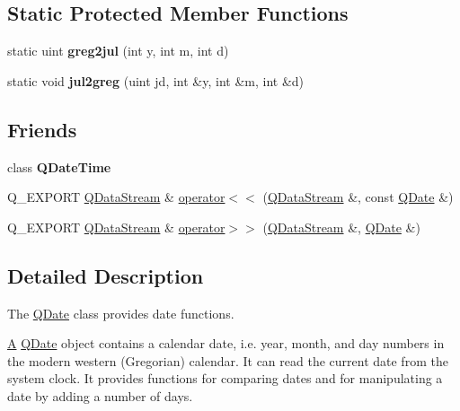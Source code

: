 \subsection*{Static Protected Member Functions}
\begin{DoxyCompactItemize}
\item 
\mbox{\label{class_q_date_a04d5e854090cbd10ab4d8771877e5364}} 
static uint {\bfseries greg2jul} (int y, int m, int d)
\item 
\mbox{\label{class_q_date_a0e0d4e48f69f7da1bd5e6e8278acb14c}} 
static void {\bfseries jul2greg} (uint jd, int \&y, int \&m, int \&d)
\end{DoxyCompactItemize}
\subsection*{Friends}
\begin{DoxyCompactItemize}
\item 
\mbox{\label{class_q_date_a9d2632bde958bcaf78a589a11578452e}} 
class {\bfseries Q\+Date\+Time}
\item 
Q\+\_\+\+E\+X\+P\+O\+RT \mbox{\hyperlink{class_q_data_stream}{Q\+Data\+Stream}} \& \mbox{\hyperlink{class_q_date_aebb24cfcc74a8440d7aff4d211276ab8}{operator$<$$<$}} (\mbox{\hyperlink{class_q_data_stream}{Q\+Data\+Stream}} \&, const \mbox{\hyperlink{class_q_date}{Q\+Date}} \&)
\item 
Q\+\_\+\+E\+X\+P\+O\+RT \mbox{\hyperlink{class_q_data_stream}{Q\+Data\+Stream}} \& \mbox{\hyperlink{class_q_date_ace58c33ac3870ee3b24fb6ce8db6f269}{operator$>$$>$}} (\mbox{\hyperlink{class_q_data_stream}{Q\+Data\+Stream}} \&, \mbox{\hyperlink{class_q_date}{Q\+Date}} \&)
\end{DoxyCompactItemize}


\subsection{Detailed Description}
The \mbox{\hyperlink{class_q_date}{Q\+Date}} class provides date functions. 

\mbox{\hyperlink{class_a}{A}} \mbox{\hyperlink{class_q_date}{Q\+Date}} object contains a calendar date, i.\+e. year, month, and day numbers in the modern western (Gregorian) calendar. It can read the current date from the system clock. It provides functions for comparing dates and for manipulating a date by adding a number of days.

